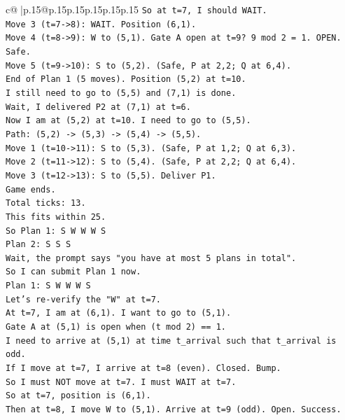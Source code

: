 \documentclass{article}
\begin{document}
{\begin{supertabular}{c@{$\;$}|p{.15\linewidth}@{}p{.15\linewidth}p{.15\linewidth}p{.15\linewidth}p{.15\linewidth}p{.15\linewidth}}
{{{\texttt{So at t=7, I should WAIT.} \\
\texttt{Move 3 (t=7{-}>8): WAIT. Position (6,1).} \\
\texttt{Move 4 (t=8{-}>9): W to (5,1). Gate A open at t=9? 9 mod 2 = 1. OPEN. Safe.} \\
\texttt{Move 5 (t=9{-}>10): S to (5,2). (Safe, P at 2,2; Q at 6,4).} \\
\texttt{End of Plan 1 (5 moves). Position (5,2) at t=10.} \\
\texttt{I still need to go to (5,5) and (7,1) is done.} \\
\texttt{Wait, I delivered P2 at (7,1) at t=6.} \\
\texttt{Now I am at (5,2) at t=10. I need to go to (5,5).} \\
\texttt{Path: (5,2) {-}> (5,3) {-}> (5,4) {-}> (5,5).} \\
\texttt{Move 1 (t=10{-}>11): S to (5,3). (Safe, P at 1,2; Q at 6,3).} \\
\texttt{Move 2 (t=11{-}>12): S to (5,4). (Safe, P at 2,2; Q at 6,4).} \\
\texttt{Move 3 (t=12{-}>13): S to (5,5). Deliver P1.} \\
\texttt{Game ends.} \\
\texttt{Total ticks: 13.} \\
\texttt{This fits within 25.} \\
\texttt{So Plan 1: S W W W S} \\
\texttt{Plan 2: S S S} \\
\texttt{Wait, the prompt says "you have at most 5 plans in total".} \\
\texttt{So I can submit Plan 1 now.} \\
\texttt{Plan 1: S W W W S} \\
\texttt{Let's re{-}verify the "W" at t=7.} \\
\texttt{At t=7, I am at (6,1). I want to go to (5,1).} \\
\texttt{Gate A at (5,1) is open when (t mod 2) == 1.} \\
\texttt{I need to arrive at (5,1) at time t\_arrival such that t\_arrival is odd.} \\
\texttt{If I move at t=7, I arrive at t=8 (even). Closed. Bump.} \\
\texttt{So I must NOT move at t=7. I must WAIT at t=7.} \\
\texttt{So at t=7, position is (6,1).} \\
\texttt{Then at t=8, I move W to (5,1). Arrive at t=9 (odd). Open. Success.} \\
}}}
\end{supertabular}}
\end{document}
